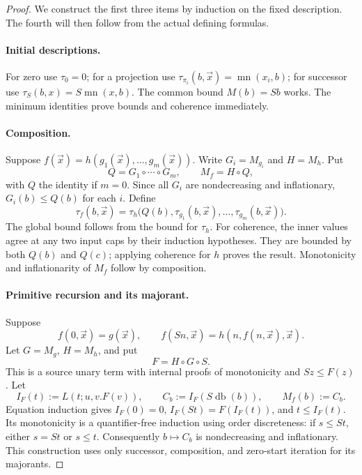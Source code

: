 \begin{proof}
We construct the first three items by induction on the fixed description.
The fourth will then follow from the actual defining formulas.

\paragraph{Initial descriptions.}
For zero use $\tau_0=0$; for a projection use
$\tau_{\pi_i}(b,\vec x)=\operatorname{mn}(x_i,b)$; for successor use
$\tau_S(b,x)=S\operatorname{mn}(x,b)$.  The common bound $M(b)=Sb$
works.  The minimum identities prove bounds and coherence immediately.

\paragraph{Composition.}
Suppose $f(\vec x)=h(g_1(\vec x),\ldots,g_m(\vec x))$.
Write $G_i=M_{g_i}$ and $H=M_h$.  Put
\[
 Q=G_1\circ\cdots\circ G_m,
 \qquad M_f=H\circ Q,
\]
with $Q$ the identity if $m=0$.  Since all $G_i$ are nondecreasing
and inflationary, $G_i(b)\leq Q(b)$ for each $i$.
Define
\[
 \tau_f(b,\vec x)=
 \tau_h\bigl(Q(b),\tau_{g_1}(b,\vec x),\ldots,
                         \tau_{g_m}(b,\vec x)\bigr).
\]
The global bound follows from the bound for $\tau_h$.  For coherence,
the inner values agree at any two input caps by their induction
hypotheses.  They are bounded by both $Q(b)$ and $Q(c)$; applying
coherence for $h$ proves the result.  Monotonicity and inflationarity
of $M_f$ follow by composition.

\paragraph{Primitive recursion and its majorant.}
Suppose
\[
 f(0,\vec x)=g(\vec x),\qquad
 f(Sn,\vec x)=h(n,f(n,\vec x),\vec x).
\]
Let $G=M_g$, $H=M_h$, and put
\[
                      F=H\circ G\circ S.
\]
This is a source unary term with internal proofs of monotonicity and
$Sz\leq F(z)$.  Let
\[
 I_F(t):=L(t;u,v.F(v)),\qquad
 C_b:=I_F(S\operatorname{db}(b)),\qquad M_f(b):=C_b.
 \tag{Majorant}\label{eq:ib-majorant}
\]
Equation induction gives $I_F(0)=0$, $I_F(St)=F(I_F(t))$,
and $t\leq I_F(t)$.  Its monotonicity is a quantifier-free induction
using order discreteness: if $s\leq St$, either $s=St$ or $s\leq t$.
Consequently $b\mapsto C_b$ is nondecreasing and inflationary.
This construction uses only successor, composition, and zero-start
iteration for its majorants.


\end{proof}
